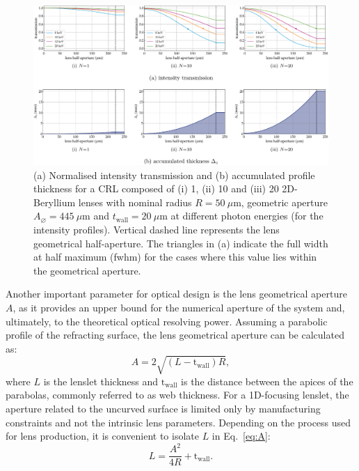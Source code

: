 \begin{refsection}
\begin{figure}[t]
    \centering
    \includegraphics[width=1\linewidth]{figures/ch03/Aeff.pdf}
    \caption[Intensity transmission and accumulated thickness profile of CRLs]{(a) Normalised intensity transmission and (b) accumulated profile thickness for a CRL composed of ($\mathrm{i}$) 1, ($\mathrm{ii}$) 10 and ($\mathrm{iii}$) 20 2D-Beryllium lenses with nominal radius $R=50~\mu\text{m}$, geometric aperture $A_{\diameter}=445~\mu\text{m}$ and $t_\text{wall}=20~\mu$m at different photon energies (for the intensity profiles). Vertical dashed line represents the lens geometrical half-aperture. The triangles in (a) indicate the full width at half maximum (fwhm) for the cases where this value lies within the geometrical aperture.}
    \label{fig:EffectiveAperure}
\end{figure}
Another important parameter for optical design is the lens geometrical aperture $A$, as it provides an upper bound for the numerical aperture of the system and, ultimately, to the theoretical optical resolving power. Assuming a parabolic profile of the refracting surface, the lens geometrical aperture can be calculated as:
\begin{equation}\label{eq:A}
    A = 2\sqrt{(L-\text{t}_\text{wall})R},
\end{equation}{}
where $L$ is the lenslet thickness and $\text{t}_\text{wall}$ is the distance between the apices of the parabolas, commonly referred to as web thickness. For a 1D-focusing lenslet, the aperture related to the uncurved surface is limited only by manufacturing constraints and not the intrinsic lens parameters. Depending on the process used for lens production, it is convenient to isolate $L$ in Eq.~\ref{eq:A}:
\begin{equation}\label{eq:L}
    L = \frac{A^2}{4R}+\text{t}_\text{wall}.
\end{equation}{}

\end{refsection}

